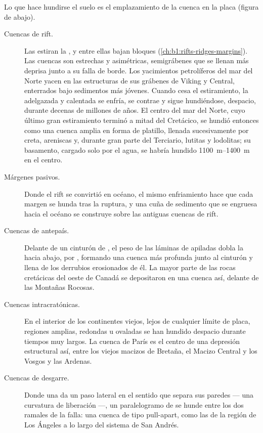 Lo que hace hundirse el suelo es el emplazamiento de la cuenca en la placa (figura de abajo).

\begin{description}
  \item[Cuencas de rift.] Las  estiran la , y entre ellas bajan bloques (\cref{ch:b1:rifts-ridges-margins}). Las cuencas son estrechas y asimétricas, semigrábenes que se llenan más deprisa junto a su falla de borde. Los yacimientos petrolíferos del mar del Norte yacen en las estructuras de sus grábenes de Viking y Central, enterrados bajo sedimentos más jóvenes. Cuando cesa el estiramiento, la  adelgazada y calentada se enfría, se contrae y sigue hundiéndose, despacio, durante decenas de millones de años. El centro del mar del Norte, cuyo último gran estiramiento terminó a mitad del Cretácico, se hundió entonces como una cuenca amplia en forma de platillo, llenada sucesivamente por creta, areniscas y, durante gran parte del Terciario, lutitas y lodolitas; su basamento, cargado solo por el agua, se habría hundido \qtyrange{1100}{1400}{m} en el centro.
  \item[Márgenes pasivos.] Donde el rift se convirtió en océano, el mismo enfriamiento hace que cada margen se hunda tras la ruptura, y una cuña de sedimento que se engruesa hacia el océano se construye sobre las antiguas cuencas de rift.
  \item[Cuencas de antepaís.] Delante de un cinturón de , el peso de las láminas de  apiladas dobla la  hacia abajo, por , formando una cuenca más profunda junto al cinturón y llena de los derrubios erosionados de él. La mayor parte de las rocas cretácicas del oeste de Canadá se depositaron en una cuenca así, delante de las Montañas Rocosas.
  \item[Cuencas intracratónicas.] En el interior de los continentes viejos, lejos de cualquier límite de placa, regiones amplias, redondas u ovaladas se han hundido despacio durante tiempos muy largos. La cuenca de París es el centro de una depresión estructural así, entre los viejos macizos de Bretaña, el Macizo Central y los Vosgos y las Ardenas.
  \item[Cuencas de desgarre.] Donde una  da un paso lateral en el sentido que separa sus paredes --- una curvatura de liberación ---, un paralelogramo de  se hunde entre los dos ramales de la falla: una cuenca de tipo pull-apart, como las de la región de Los Ángeles a lo largo del sistema de San Andrés.
\end{description}

